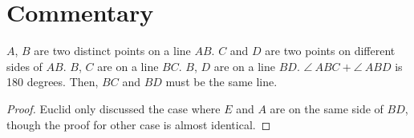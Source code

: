 \section*{Commentary}

\begin{proposition}\label{proposition_14}\leanok
    $A$, $B$ are two distinct points on a line $AB$. $C$ and $D$ are two points on different sides of $AB$. $B$, $C$ are on a line $BC$. $B$, $D$ are on a line $BD$. $\angle~ABC + \angle~ABD$ is 180 degrees. Then, $BC$ and $BD$ must be the same line.
\end{proposition}
\begin{proof}
    \leanok
    Euclid only discussed the case where $E$ and $A$ are on the same side of $BD$, though the proof for other case is almost identical. 
\end{proof}
